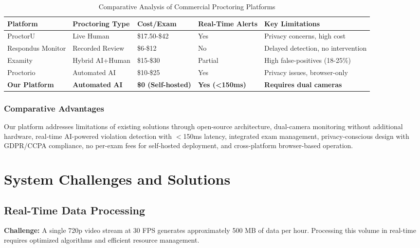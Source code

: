 \begin{table}[ht]
\centering
\caption{Comparative Analysis of Commercial Proctoring Platforms}
\label{tab:proctoring_comparison}
\begin{tabular}{|p{3cm}|p{2.5cm}|p{2.5cm}|p{2.5cm}|p{3cm}|}
\hline
\textbf{Platform} & \textbf{Proctoring Type} & \textbf{Cost/Exam} & \textbf{Real-Time Alerts} & \textbf{Key Limitations} \\
\hline
ProctorU & Live Human & \$17.50-\$42 & Yes & Privacy concerns, high cost \\
\hline
Respondus Monitor & Recorded Review & \$6-\$12 & No & Delayed detection, no intervention \\
\hline
Examity & Hybrid AI+Human & \$15-\$30 & Partial & High false-positives (18-25\%) \\
\hline
Proctorio & Automated AI & \$10-\$25 & Yes & Privacy issues, browser-only \\
\hline
\textbf{Our Platform} & \textbf{Automated AI} & \textbf{\$0 (Self-hosted)} & \textbf{Yes (<150ms)} & \textbf{Requires dual cameras} \\
\hline
\end{tabular}
\end{table}

\subsubsection{Comparative Advantages}

Our platform addresses limitations of existing solutions through open-source architecture, dual-camera monitoring without additional hardware, real-time AI-powered violation detection with $<$150ms latency, integrated exam management, privacy-conscious design with GDPR/CCPA compliance, no per-exam fees for self-hosted deployment, and cross-platform browser-based operation.

\section{System Challenges and Solutions}

\subsection{Real-Time Data Processing}

\textbf{Challenge:} A single 720p video stream at 30 FPS generates approximately 500 MB of data per hour. Processing this volume in real-time requires optimized algorithms and efficient resource management.

